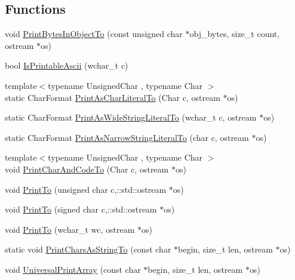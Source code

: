 \subsection*{\-Functions}
\begin{DoxyCompactItemize}
\item 
void \hyperlink{namespacetesting_1_1internal2_abfb9aa80365f93b952e9a4bea09947a8}{\-Print\-Bytes\-In\-Object\-To} (const unsigned char $\ast$obj\-\_\-bytes, size\-\_\-t count, ostream $\ast$os)
\item 
bool \hyperlink{namespacetesting_1_1internal_ae7c464130d5d4632bb08df350c66869f}{\-Is\-Printable\-Ascii} (wchar\-\_\-t c)
\item 
{\footnotesize template$<$typename Unsigned\-Char , typename Char $>$ }\\static \-Char\-Format \hyperlink{namespacetesting_1_1internal_a5472be419321e05354788f87d8409a79}{\-Print\-As\-Char\-Literal\-To} (\-Char c, ostream $\ast$os)
\item 
static \-Char\-Format \hyperlink{namespacetesting_1_1internal_a25cbfd96a9ccc7314c8b4472980cbb5c}{\-Print\-As\-Wide\-String\-Literal\-To} (wchar\-\_\-t c, ostream $\ast$os)
\item 
static \-Char\-Format \hyperlink{namespacetesting_1_1internal_ae8bdfe0d29f4b506f147ce1b1c57cea1}{\-Print\-As\-Narrow\-String\-Literal\-To} (char c, ostream $\ast$os)
\item 
{\footnotesize template$<$typename Unsigned\-Char , typename Char $>$ }\\void \hyperlink{namespacetesting_1_1internal_a117e16766ae3c43766d495a7e6c9c83c}{\-Print\-Char\-And\-Code\-To} (\-Char c, ostream $\ast$os)
\item 
void \hyperlink{namespacetesting_1_1internal_a5f9c0007343edeecab8e18be2d27f26d}{\-Print\-To} (unsigned char c,\-::std\-::ostream $\ast$os)
\item 
void \hyperlink{namespacetesting_1_1internal_a16c1e1401b5c161a1e44953aa25814d9}{\-Print\-To} (signed char c,\-::std\-::ostream $\ast$os)
\item 
void \hyperlink{namespacetesting_1_1internal_a111d66cb3eb7512a837e2e9195efe7cf}{\-Print\-To} (wchar\-\_\-t wc, ostream $\ast$os)
\item 
static void \hyperlink{namespacetesting_1_1internal_a3eae22103d281abcff8c348a7278c9ed}{\-Print\-Chars\-As\-String\-To} (const char $\ast$begin, size\-\_\-t len, ostream $\ast$os)
\item 
void \hyperlink{namespacetesting_1_1internal_a555e9351033d7eafe4482423a9b7d6ca}{\-Universal\-Print\-Array} (const char $\ast$begin, size\-\_\-t len, ostream $\ast$os)

\end{DoxyCompactItemize}
